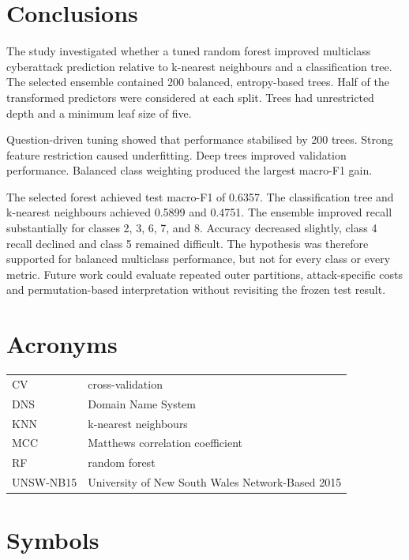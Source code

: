 \documentclass[conference]{IEEEtran}
\begin{document}
\section{Conclusions}

The study investigated whether a tuned random forest improved multiclass cyberattack prediction relative to k-nearest neighbours and a classification tree. The selected ensemble contained 200 balanced, entropy-based trees. Half of the transformed predictors were considered at each split. Trees had unrestricted depth and a minimum leaf size of five.

Question-driven tuning showed that performance stabilised by 200 trees. Strong feature restriction caused underfitting. Deep trees improved validation performance. Balanced class weighting produced the largest macro-F1 gain.

The selected forest achieved test macro-F1 of 0.6357. The classification tree and k-nearest neighbours achieved 0.5899 and 0.4751. The ensemble improved recall substantially for classes 2, 3, 6, 7, and 8. Accuracy decreased slightly, class 4 recall declined and class 5 remained difficult. The hypothesis was therefore supported for balanced multiclass performance, but not for every class or every metric. Future work could  evaluate repeated outer partitions, attack-specific costs and permutation-based interpretation without revisiting the frozen test result.

\appendices
\section{Acronyms}

\begin{table}[ht]
\centering
\begin{tabular}{ll}
\toprule
CV & cross-validation\\
DNS & Domain Name System\\
KNN & k-nearest neighbours\\
MCC & Matthews correlation coefficient\\
RF & random forest\\
UNSW-NB15 & University of New South Wales Network-Based 2015\\
\bottomrule
\end{tabular}
\end{table}

\section{Symbols}
\end{document}
